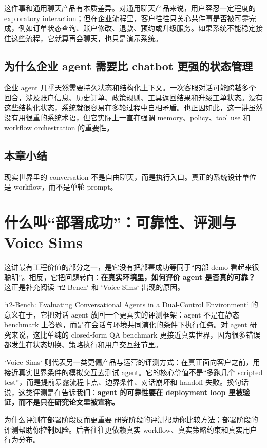 \documentclass[a4paper]{article}
\begin{document}
这件事和通用聊天产品有本质差异。对通用聊天产品来说，用户容忍一定程度的 exploratory interaction；但在企业流程里，客户往往只关心某件事是否被可靠完成，例如订单状态查询、账户修改、退款、预约或升级服务。如果系统不能稳定接住这些流程，它就算再会聊天，也只是演示系统。

\subsection{为什么企业 agent 需要比 chatbot 更强的状态管理}
企业 agent 几乎天然需要持久状态和结构化上下文。一次客服对话可能跨越多个回合，涉及账户信息、历史订单、政策规则、工具返回结果和升级工单状态。没有这些结构化状态，系统就很容易在多轮过程中自相矛盾。也正因如此，这一讲虽然没有用很重的系统术语，但它实际上一直在强调 memory、policy、tool use 和 workflow orchestration 的重要性。

\subsection{本章小结}
现实世界里的 conversation 不是自由聊天，而是执行入口。真正的系统设计单位是 workflow，而不是单轮 prompt。

\section{什么叫“部署成功”：可靠性、评测与 Voice Sims}
这讲最有工程价值的部分之一，是它没有把部署成功等同于“内部 demo 看起来很聪明”。相反，它把问题转向：\textbf{在真实环境里，如何评价 agent 是否真的可靠？} 这正是补充阅读 `τ2-Bench` 和 `Voice Sims` 出现的原因。

`τ2-Bench: Evaluating Conversational Agents in a Dual-Control Environment` 的意义在于，它把对话 agent 放回一个更真实的评测框架：agent 不是在静态 benchmark 上答题，而是在会话与环境共同演化的条件下执行任务。对 agent 研究来说，这比单纯的 closed-form QA benchmark 更接近真实世界，因为很多错误都发生在状态切换、策略执行和用户交互细节里。

`Voice Sims` 则代表另一类更偏产品与运营的评测方式：在真正面向客户之前，用接近真实世界条件的模拟交互去测试 agent。它的核心价值不是“多跑几个 scripted test”，而是提前暴露流程卡点、边界条件、对话崩坏和 handoff 失败。换句话说，这类评测是在告诉我们：\textbf{agent 的可靠性要在 deployment loop 里被验证，而不是只在研究论文里被宣称。}

\begin{knowledgebox}{为什么评测在部署阶段反而更重要}
研究阶段的评测帮助你比较方法；部署阶段的评测帮助你控制风险。后者往往更依赖真实 workflow、真实策略约束和真实用户行为分布。
\end{knowledgebox}
\end{document}
